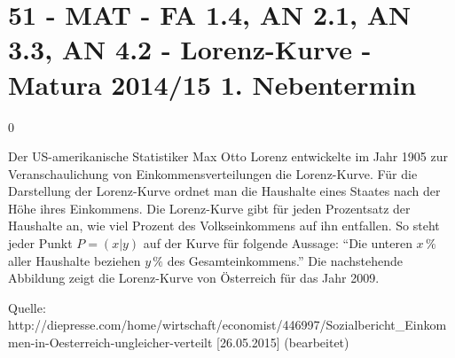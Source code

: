 \section{51 - MAT - FA 1.4, AN 2.1, AN 3.3, AN 4.2 - Lorenz-Kurve - Matura 2014/15 1. Nebentermin}

\begin{langesbeispiel} \item[0] %
				
	Der US-amerikanische Statistiker Max Otto Lorenz entwickelte im Jahr 1905 zur Veranschaulichung von Einkommensverteilungen die Lorenz-Kurve. Für die Darstellung der Lorenz-Kurve ordnet man die Haushalte eines Staates nach der Höhe ihres Einkommens.  Die Lorenz-Kurve gibt für jeden Prozentsatz der Haushalte an, wie viel Prozent des Volkseinkommens auf ihn entfallen. So steht jeder Punkt $P=(x|y)$ auf der Kurve für folgende Aussage: "`Die unteren $x\,\%$ aller Haushalte beziehen $y\,\%$ des Gesamteinkommens."' Die nachstehende Abbildung zeigt die Lorenz-Kurve von Österreich für das Jahr 2009. 
				
				\begin{center}
				\end{center}
				\begin{singlespace}\begin{scriptsize} Quelle: http://diepresse.com/home/wirtschaft/economist/446997/Sozialbericht\_Einkommen-in-Oesterreich-ungleicher-verteilt [26.05.2015] (bearbeitet)\end{scriptsize}\end{singlespace}
				

\end{langesbeispiel}
